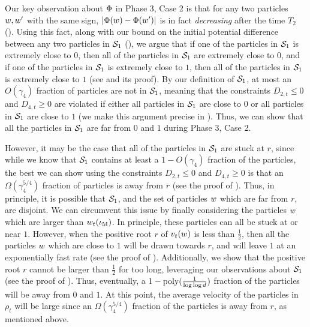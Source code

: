 Our key observation about $\Phi$ in Phase 3, Case 2 is that for any two particles $w, w'$ with the same sign, $|\Phi(w) - \Phi(w')|$ is in fact \textit{decreasing} after the time $T_2$ (). Using this fact, along with our bound on the initial potential difference between any two particles in $\mathcal{S}_1$ (), we argue that if one of the particles in $\mathcal{S}_1$ is extremely close to $0$, then all of the particles in $\mathcal{S}_1$ are extremely close to $0$, and if one of the particles in $\mathcal{S}_1$ is extremely close to $1$, then all of the particles in $\mathcal{S}_1$ is extremely close to $1$ (see  and its proof). By our definition of $\mathcal{S}_1$, at most an $O(\gamma_4)$ fraction of particles are not in $\mathcal{S}_1$, meaning that the constraints $D_{2, t} \leq 0$ and $D_{4, t} \geq 0$ are violated if either all particles in $\mathcal{S}_1$ are close to $0$ or all particles in $\mathcal{S}_1$ are close to $1$ (we make this argument precise in ). Thus, we can show that all the particles in $\mathcal{S}_1$ are far from $0$ and $1$ during Phase 3, Case 2. 

However, it may be the case that all of the particles in $\mathcal{S}_1$ are stuck at $r$, since while we know that $\mathcal{S}_1$ contains at least a $1 - O(\gamma_4)$ fraction of the particles, the best we can show using the constraints $D_{2, t} \leq 0$ and $D_{4, t} \geq 0$ is that an $\Omega(\gamma_4^{5/4})$ fraction of particles is away from $r$ (see the proof of ). Thus, in principle, it is possible that $\mathcal{S}_1$, and the set of particles $w$ which are far from $r$, are disjoint. We can circumvent this issue by finally considering the particles $w$ which are larger than $w_t(\iota_{\textup{M}})$. In principle, these particles can all be stuck at or near $1$. However, when the positive root $r$ of $v_t(w)$ is less than $\frac{1}{2}$, then all the particles $w$ which are close to $1$ will be drawn towards $r$, and will leave $1$ at an exponentially fast rate (see the proof of ). Additionally, we show that the positive root $r$ cannot be larger than $\frac{1}{2}$ for too long, leveraging our observations about $\mathcal{S}_1$ (see the proof of ). Thus, eventually, a $1 - \textup{poly}(\frac{1}{\log \log d})$ fraction of the particles will be away from $0$ and $1$. At this point, the average velocity of the particles in $\rho_t$ will be large since an $\Omega(\gamma_4^{5/4})$ fraction of the particles is away from $r$, as mentioned above.

